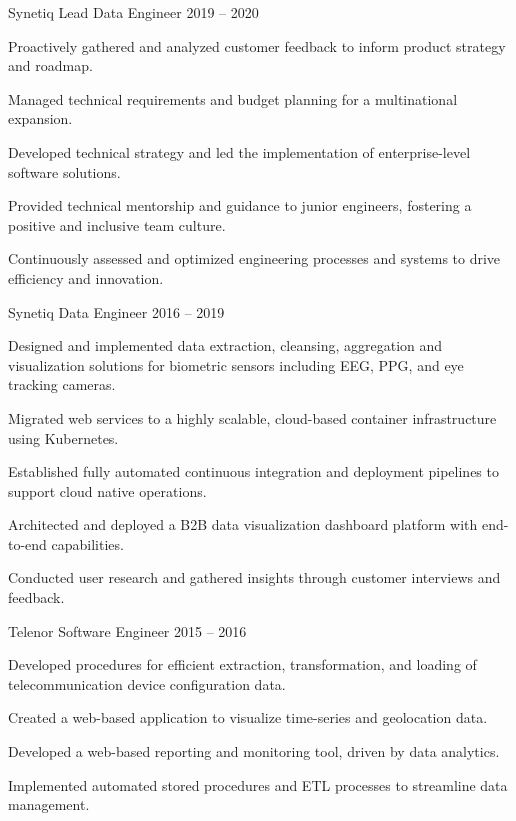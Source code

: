\documentclass[]{awesome-cv}
\begin{document}
\begin{cventries}
	\cventry
	{Synetiq}
	{Lead Data Engineer}
	{2019 – 2020}
	{}
	{\begin{cvitems}
		\item {Proactively gathered and analyzed customer feedback to inform product strategy and roadmap.}
		\item {Managed technical requirements and budget planning for a multinational expansion.}
		\item {Developed technical strategy and led the implementation of enterprise-level software solutions.}
		\item {Provided technical mentorship and guidance to junior engineers, fostering a positive and inclusive team culture.}
		\item {Continuously assessed and optimized engineering processes and systems to drive efficiency and innovation.}
		\end{cvitems}}
	\cventry
	{Synetiq}
	{Data Engineer}
	{2016 – 2019}
	{}
	{\begin{cvitems}
		\item {Designed and implemented data extraction, cleansing, aggregation and visualization solutions for biometric sensors including EEG, PPG, and eye tracking cameras.}
		\item {Migrated web services to a highly scalable, cloud-based container infrastructure using Kubernetes.}
		\item {Established fully automated continuous integration and deployment pipelines to support cloud native operations.}
		\item {Architected and deployed a B2B data visualization dashboard platform with end-to-end capabilities.}
		\item {Conducted user research and gathered insights through customer interviews and feedback.}
		\end{cvitems}}
	\cventry
	{Telenor}
	{Software Engineer}
	{2015 – 2016}
	{}
	{\begin{cvitems}
		\item {Developed procedures for efficient extraction, transformation, and loading of telecommunication device configuration data.}
		\item {Created a web-based application to visualize time-series and geolocation data.}
		\item {Developed a web-based reporting and monitoring tool, driven by data analytics.}
		\item {Implemented automated stored procedures and ETL processes to streamline data management.}
		\end{cvitems}}
\end{cventries}
\end{document}
